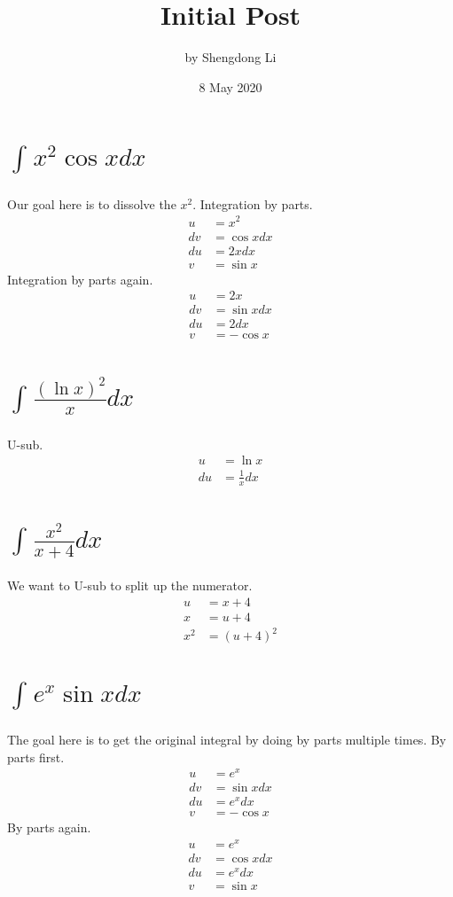 \documentclass[letterpaper, 12pt]{article}
\begin{document}
\title{Initial Post}
\author{by Shengdong Li}
\date{8 May 2020}
\maketitle

\section{$\int_{ }^{ }x^{2}\cos xdx$}
Our goal here is to dissolve the $x^2$. Integration by parts.
\begin{align}
    u  & =x^{2}    \\
    dv & =\cos xdx \\
    du & =2xdx     \\
    v  & =\sin x
\end{align}
Integration by parts again.
\begin{align}
    u  & =2x       \\
    dv & =\sin xdx \\
    du & =2dx      \\
    v  & =-\cos x
\end{align}
\setcounter{equation}{0}
\section{$\int_{ }^{ }\frac{\left(\ln x\right)^{2}}{x}dx$}
U-sub.
\begin{align}
    u  & =\ln x         \\
    du & =\frac{1}{x}dx
\end{align}
\setcounter{equation}{0}
\section{$\int_{ }^{ }\frac{x^{2}}{x+4}dx$}
We want to U-sub to split up the numerator.
\begin{align}
    u     & =x+4                  \\
    x     & =u+4                  \\
    x^{2} & =\left(u+4\right)^{2}
\end{align}
\setcounter{equation}{0}
\section{$\int_{ }^{ }e^{x}\sin xdx$}
The goal here is to get the original integral by doing by parts multiple times.
By parts first.
\begin{align}
    u  & =e^{x}    \\
    dv & =\sin xdx \\
    du & =e^{x}dx  \\
    v  & =-\cos x
\end{align}
By parts again.
\begin{align}
    u  & =e^{x}    \\
    dv & =\cos xdx \\
    du & =e^{x}dx  \\
    v  & =\sin x
\end{align}
\setcounter{equation}{0}
\end{document}
